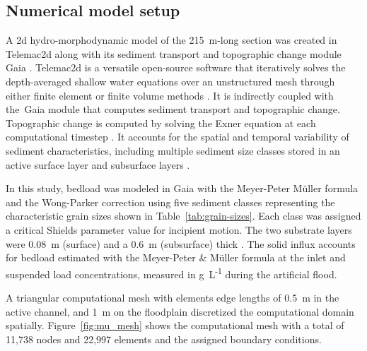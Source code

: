 \documentclass[draft,linenumbers,onecolumn]{agujournal2019} %
\begin{document}
\subsection{Numerical model setup}
\label{sec:numerical-model}

A 2d hydro-morphodynamic model of the 215~m-long section was created in Telemac2d \cite{hervouet2020telemac2d} along with its sediment transport and topographic change module Gaia \cite{tassi2023gaia}. Telemac2d is a  versatile open-source software that iteratively solves the depth-averaged shallow water equations \cite{saint-venant1871theorie} over an unstructured mesh through either finite element or finite volume methods \cite{galland1991telemac,hervouet2007hydrodynamics}. It is indirectly coupled with the Gaia module that computes sediment transport and topographic change.  Topographic change is computed by solving the Exner equation at each computational timestep \cite{exner1925uber,audouin2020introducing}. It accounts for the spatial and temporal variability of sediment characteristics, including multiple sediment size classes stored in an active surface layer and subsurface layers \cite{hirano1971riverbed}. 

In this study, bedload was modeled in Gaia with the Meyer-Peter Müller formula \cite{meyer-peter1948formulas} and the Wong-Parker correction \cite{wong2006reanalysis} using five sediment classes representing the characteristic grain sizes shown in Table~\ref{tab:grain-sizes}. Each class was assigned a critical Shields parameter \cite{shields1936anwendung} value for incipient motion. The two substrate layers were 0.08~m (surface) and a 0.6~m (subsurface) thick \cite{scolari2025hydromorphodynamic}. The solid influx accounts for bedload estimated with the Meyer-Peter \& Müller formula at the inlet and suspended load concentrations, measured in g~L\textsuperscript{-1} during the artificial flood.

A triangular computational mesh with elements edge lengths of 0.5~m in the active channel, and 1~m on the floodplain discretized the computational domain spatially. Figure~\ref{fig:mu_mesh} shows the computational mesh with a total of 11,738 nodes and 22,997 elements and the assigned boundary conditions.

\end{document}
